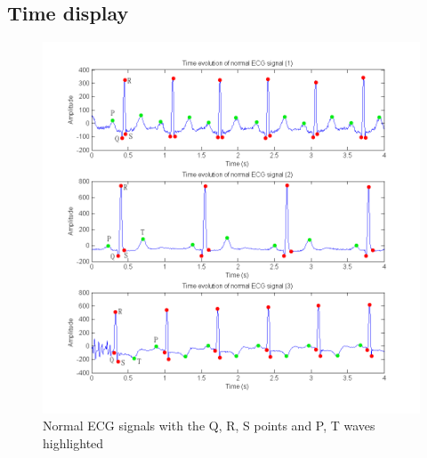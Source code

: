 \documentclass[11pt]{article}
\begin{document}
	\subsection{Time display}
		\begin{figure}[ht]
			\centering
			\includegraphics[scale=0.65]{images/Q311.png}
			\caption{Normal ECG signals with the Q, R, S points and P, T waves highlighted}
			\label{Q311}
		\end{figure}
\end{document}
